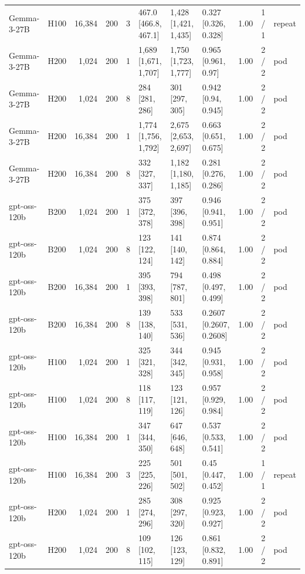 \begin{landscape}
\begin{longtable}{llrrrlllrll}
Gemma-3-27B & H100 & 16,384 & 200 & 3 & 467.0 {[}466.8, 467.1{]} & 1,428 {[}1,421, 1,435{]} & 0.327 {[}0.326, 0.328{]} & 1.00 & 1 / 1 & repeat \\
Gemma-3-27B & H200 & 1,024 & 200 & 1 & 1,689 {[}1,671, 1,707{]} & 1,750 {[}1,723, 1,777{]} & 0.965 {[}0.961, 0.97{]} & 1.00 & 2 / 2 & pod \\
Gemma-3-27B & H200 & 1,024 & 200 & 8 & 284 {[}281, 286{]} & 301 {[}297, 305{]} & 0.942 {[}0.94, 0.945{]} & 1.00 & 2 / 2 & pod \\
Gemma-3-27B & H200 & 16,384 & 200 & 1 & 1,774 {[}1,756, 1,792{]} & 2,675 {[}2,653, 2,697{]} & 0.663 {[}0.651, 0.675{]} & 1.00 & 2 / 2 & pod \\
Gemma-3-27B & H200 & 16,384 & 200 & 8 & 332 {[}327, 337{]} & 1,182 {[}1,180, 1,185{]} & 0.281 {[}0.276, 0.286{]} & 1.00 & 2 / 2 & pod \\
gpt-oss-120b & B200 & 1,024 & 200 & 1 & 375 {[}372, 378{]} & 397 {[}396, 398{]} & 0.946 {[}0.941, 0.951{]} & 1.00 & 2 / 2 & pod \\
gpt-oss-120b & B200 & 1,024 & 200 & 8 & 123 {[}122, 124{]} & 141 {[}140, 142{]} & 0.874 {[}0.864, 0.884{]} & 1.00 & 2 / 2 & pod \\
gpt-oss-120b & B200 & 16,384 & 200 & 1 & 395 {[}393, 398{]} & 794 {[}787, 801{]} & 0.498 {[}0.497, 0.499{]} & 1.00 & 2 / 2 & pod \\
gpt-oss-120b & B200 & 16,384 & 200 & 8 & 139 {[}138, 140{]} & 533 {[}531, 536{]} & 0.2607 {[}0.2607, 0.2608{]} & 1.00 & 2 / 2 & pod \\
gpt-oss-120b & H100 & 1,024 & 200 & 1 & 325 {[}321, 328{]} & 344 {[}342, 345{]} & 0.945 {[}0.931, 0.958{]} & 1.00 & 2 / 2 & pod \\
gpt-oss-120b & H100 & 1,024 & 200 & 8 & 118 {[}117, 119{]} & 123 {[}121, 126{]} & 0.957 {[}0.929, 0.984{]} & 1.00 & 2 / 2 & pod \\
gpt-oss-120b & H100 & 16,384 & 200 & 1 & 347 {[}344, 350{]} & 647 {[}646, 648{]} & 0.537 {[}0.533, 0.541{]} & 1.00 & 2 / 2 & pod \\
gpt-oss-120b & H100 & 16,384 & 200 & 3 & 225 {[}225, 226{]} & 501 {[}501, 502{]} & 0.45 {[}0.447, 0.452{]} & 1.00 & 1 / 1 & repeat \\
gpt-oss-120b & H200 & 1,024 & 200 & 1 & 285 {[}274, 296{]} & 308 {[}297, 320{]} & 0.925 {[}0.923, 0.927{]} & 1.00 & 2 / 2 & pod \\
gpt-oss-120b & H200 & 1,024 & 200 & 8 & 109 {[}102, 115{]} & 126 {[}123, 129{]} & 0.861 {[}0.832, 0.891{]} & 1.00 & 2 / 2 & pod \\

\end{longtable}
\end{landscape}
